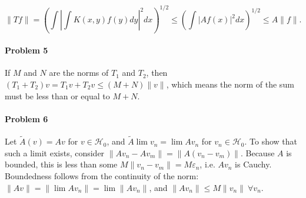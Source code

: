 \documentclass[11pt]{article}
\renewcommand{\H}{\mathcal{H}}
\begin{document}
\begin{displaymath}
  \|Tf\| =\left(\int\left|\int K(x,y)f(y)dy\right|^2dx\right)^{1/2}
  \leq \left(\int|Af(x)|^2dx\right)^{1/2}\leq A\|f\|.
\end{displaymath}

\paragraph{Problem 5}
If $M$ and $N$ are the norms of $T_1$ and $T_2$, then $(T_1+T_2)v = T_1v + T_2v
\leq (M+N)\|v\|$, which means the norm of the sum must be less than or equal
to $M+N$.

\paragraph{Problem 6}

Let $\tilde{A}(v) = Av$ for $v \in \H_0$, and $\tilde{A}\lim v_n = \lim Av_n$
for $v_n \in \H_0$. To show that such a limit exists, consider $\|Av_n - Av_m\|=
\|A(v_n-v_m)\|$. Because $A$ is bounded, this is less than some $M\|v_n-v_m\| =
M\varepsilon_n$, i.e. $Av_n$ is Cauchy. Boundedness follows from the continuity
of the norm: $\|Av\| = \|\lim Av_n\| = \lim \|Av_n\|$, and $\|Av_n\|\leq M\|v_n
\|\ \forall v_n$.
\end{document}
